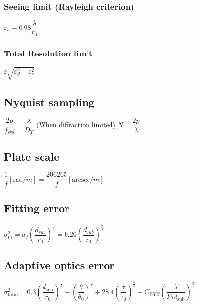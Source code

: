 \subsubsection{Seeing limit (Rayleigh criterion)}			
\begin{itemize}
\itemt \( \varepsilon_s = 0.98 \dfrac{\lambda}{r_0} \)
\end{itemize}

\subsubsection{Total Resolution limit}			
\begin{itemize}
\itemt \( \varepsilon \sqrt{\varepsilon_d^2 + \varepsilon_s^2} \)
\end{itemize}

\subsection{Nyquist sampling}		
\begin{itemize}
\itemt \( \dfrac{2p}{f_\mathrm{sys}} = \dfrac{\lambda}{D_T} \) \tab (When diffraction limited)
\itemt \( N = \dfrac{2p}{\lambda} \)
\end{itemize}			

\subsection{Plate scale}		
\begin{itemize}
\itemt \( \dfrac{1}{f} [\mathrm{rad}/m] = \dfrac{206265}{f} [\mathrm{arcsec}/m] \)
\end{itemize}

\subsection{Fitting error}		
\begin{itemize}
\itemt \( \sigma_\mathrm{fit}^2 = a_f (\dfrac{d_{sub}}{r_0})^{\frac{5}{3}} = 0.26 (\dfrac{d_{sub}}{r_0})^{\frac{5}{3}} \)
\end{itemize}

\subsection{Adaptive optics error}
\begin{itemize}
\itemt \( \sigma_\mathrm{total}^2 = 0.3(\dfrac{d_\mathrm{sub}}{r_0})^{\frac{5}{3}} + (\dfrac{\theta}{\theta_0})^{\frac{5}{3}} + 28.4(\dfrac{\tau}{\tau_0})^{\frac{5}{3}} + C_{WFS} (\dfrac{\lambda}{F\tau d_\mathrm{sub}})^2 \)
\end{itemize}
		 
